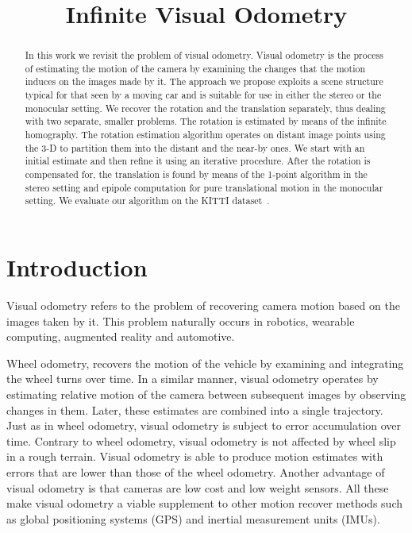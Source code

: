 \documentclass{bmvc2k}
\title{Infinite Visual Odometry}
\begin{document}
\maketitle

\begin{abstract}
  In this work we revisit the problem of visual odometry. Visual
  odometry is the process of estimating the motion of the camera by
  examining the changes that the motion induces on the images made by
  it. The approach we propose exploits a scene structure typical for
  that seen by a moving car and is suitable for use in either the
  stereo or the monocular setting.  We recover the rotation and the
  translation separately, thus dealing with two separate, smaller
  problems. The rotation is estimated by means of the infinite
  homography. The rotation estimation algorithm operates on distant
  image points using the 3-D to partition them into the distant and
  the near-by ones. We start with an initial estimate and then refine
  it using an iterative procedure. After the rotation is compensated
  for, the translation is found by means of the 1-point algorithm in
  the stereo setting and epipole computation for pure translational
  motion in the monocular setting. We evaluate our algorithm on the
  KITTI dataset~\cite{Geiger2012}.

\end{abstract}


\section{Introduction}

Visual odometry refers to the problem of recovering camera motion
based on the images taken by it. This problem naturally occurs in
robotics, wearable computing, augmented reality and automotive.

Wheel odometry, recovers the motion of the vehicle by examining and
integrating the wheel turns over time.  In a similar manner, visual
odometry operates by estimating relative motion of the camera between
subsequent images by observing changes in them. Later, these estimates
are combined into a single trajectory. Just as in wheel odometry,
visual odometry is subject to error accumulation over time. Contrary
to wheel odometry, visual odometry is not affected by wheel slip in a
rough terrain. Visual odometry is able to produce motion estimates
with errors that are lower than those of the wheel odometry. Another
advantage of visual odometry is that cameras are low cost and low
weight sensors.  All these make visual odometry a viable supplement to
other motion recover methods such as global positioning systems (GPS)
and inertial measurement units (IMUs).
\end{document}
